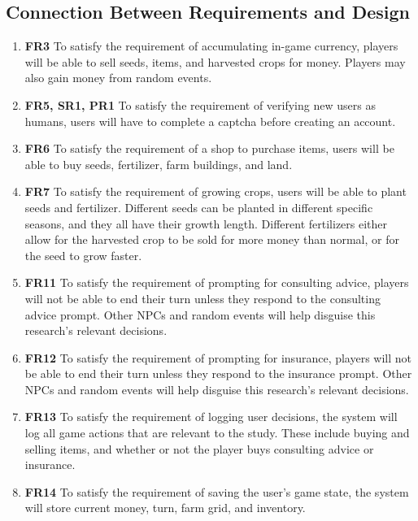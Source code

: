 \documentclass[12pt, titlepage]{article}
\begin{document}
\subsection{Connection Between Requirements and Design} \label{SecConnection}

\begin{enumerate}
    \item \textbf{FR3} To satisfy the requirement of accumulating in-game currency, players will be able to sell seeds, items, and harvested crops for money. Players may also gain money from random events.\\
    \item \textbf{FR5, SR1, PR1} To satisfy the requirement of verifying new users as humans, users will have to complete a captcha before creating an account.\\
    \item \textbf{FR6} To satisfy the requirement of a shop to purchase items, users will be able to buy seeds, fertilizer, farm buildings, and land.\\
    \item \textbf{FR7} To satisfy the requirement of growing crops, users will be able to plant seeds and fertilizer. Different seeds can be planted in different specific seasons, and they all have their growth length. Different fertilizers either allow for the harvested crop to be sold for more money than normal, or for the seed to grow faster.\\
    \item \textbf{FR11} To satisfy the requirement of prompting for consulting advice, players will not be able to end their turn unless they respond to the consulting advice prompt. Other NPCs and random events will help disguise this research's relevant decisions.\\
    \item \textbf{FR12} To satisfy the requirement of prompting for insurance, players will not be able to end their turn unless they respond to the insurance prompt. Other NPCs and random events will help disguise this research's relevant decisions.\\
    \item \textbf{FR13} To satisfy the requirement of logging user decisions, the system will log all game actions that are relevant to the study. These include buying and selling items, and whether or not the player buys consulting advice or insurance.\\
    \item \textbf{FR14} To satisfy the requirement of saving the user's game state, the system will store current money, turn, farm grid, and inventory.\\

\end{enumerate}
\end{document}

